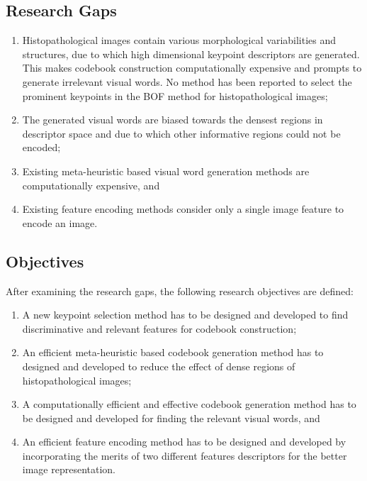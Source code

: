 \subsection{Research Gaps}
\begin{enumerate}
\item  Histopathological images contain various morphological variabilities and structures, due to which high dimensional keypoint descriptors are generated. This makes codebook construction computationally expensive and prompts to generate irrelevant visual words. No method has been reported to select the prominent keypoints in the BOF method for histopathological images;

\item The generated visual words are biased towards the densest regions in descriptor space and due to which other informative regions could not be encoded; 

\item Existing meta-heuristic based visual word generation methods are computationally expensive, and 
\item Existing feature encoding methods consider only a single image feature to encode an image. 

\end{enumerate}



\subsection{Objectives}
After examining the research gaps, the following research objectives are defined:
\begin{enumerate}
    
    \item A new keypoint selection method has to be designed and developed to find discriminative and relevant features for codebook construction;

    \item An efficient meta-heuristic based codebook generation method has to designed and developed to reduce the effect of dense regions of histopathological images;
    
    \item A computationally efficient and effective codebook generation method has to be designed and developed for finding the relevant visual words, and
    

    \item An efficient feature encoding method has to be designed and developed by incorporating the merits of two different features descriptors for the better image representation.
    
\end{enumerate}



